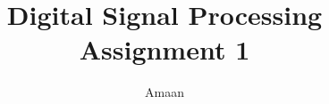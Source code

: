 \documentclass[journal,12pt,twocolumn]{IEEEtran}
\begin{document}
	\providecommand{\dec}[2]{\ensuremath{\overset{#1}{\underset{#2}{\gtrless}}}}
	\makeatletter
	\makeatother
	\let\StandardTheFigure\thefigure
	\renewcommand{\thefigure}{\theproblem}
	\def\putbox#1#2#3{\makebox[0in][l]{\makebox[#1][l]{}\raisebox{\baselineskip}[0in][0in]{\raisebox{#2}[0in][0in]{#3}}}}
	\def\rightbox#1{\makebox[0in][r]{#1}}
	\def\centbox#1{\makebox[0in]{#1}}
	\def\topbox#1{\raisebox{-\baselineskip}[0in][0in]{#1}}
	\def\midbox#1{\raisebox{-0.5\baselineskip}[0in][0in]{#1}}
	\vspace{3cm}

\title{ 
Digital Signal Processing
\linebreak
\large Assignment 1
}


%
%
%
\author{ Amaan %
}
% 
%
\end{document}
